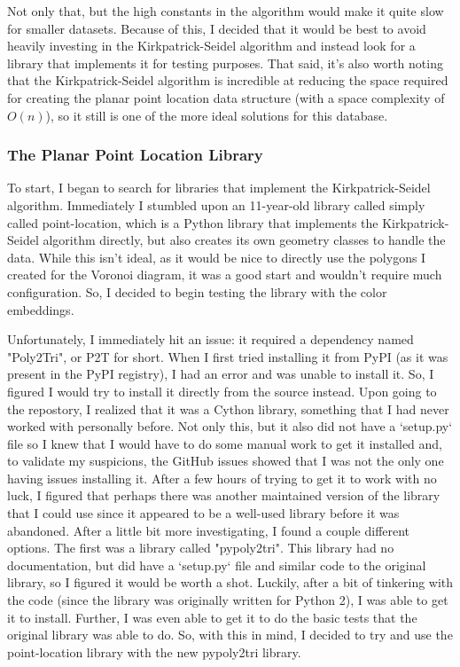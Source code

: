 \documentclass{article}
\begin{document}
\noindent
Not only that, but the high constants in the algorithm would make it quite slow for smaller datasets. Because of this, I decided that it would be best to avoid heavily investing in the Kirkpatrick-Seidel algorithm and instead look for a library that implements it for testing purposes. That said, it's also worth noting that the Kirkpatrick-Seidel algorithm is incredible at reducing the space required for creating the planar point location data structure (with a space complexity of $O(n)$), so it still is one of the more ideal solutions for this database.

\subsubsection{The Planar Point Location Library}
To start, I began to search for libraries that implement the Kirkpatrick-Seidel algorithm. Immediately I stumbled upon an 11-year-old library called simply called point-location\cite{pointLocation}, which is a Python library that implements the Kirkpatrick-Seidel algorithm directly, but also creates its own geometry classes to handle the data. While this isn't ideal, as it would be nice to directly use the polygons I created for the Voronoi diagram, it was a good start and wouldn't require much configuration. So, I decided to begin testing the library with the color embeddings.
\newline

\noindent
Unfortunately, I immediately hit an issue: it required a dependency named "Poly2Tri", or P2T for short. When I first tried installing it from PyPI (as it was present in the PyPI registry), I had an error and was unable to install it. So, I figured I would try to install it directly from the source instead. Upon going to the repostory, I realized that it was a Cython library, something that I had never worked with personally before. Not only this, but it also did not have a `setup.py` file so I knew that I would have to do some manual work to get it installed and, to validate my suspicions, the GitHub issues showed that I was not the only one having issues installing it. After a few hours of trying to get it to work with no luck, I figured that perhaps there was another maintained version of the library that I could use since it appeared to be a well-used library before it was abandoned. After a little bit more investigating, I found a couple different options.
The first was a library called "pypoly2tri". This library had no documentation, but did have a `setup.py`
file and similar code to the original library, so I figured it would be worth a shot. Luckily, after a bit
of tinkering with the code (since the library was originally written for Python 2), I was able to get it to
install. Further, I was even able to get it to do the basic tests that the original library was able to do.
So, with this in mind, I decided to try and use the point-location library with the new pypoly2tri library.
\newline
\end{document}
